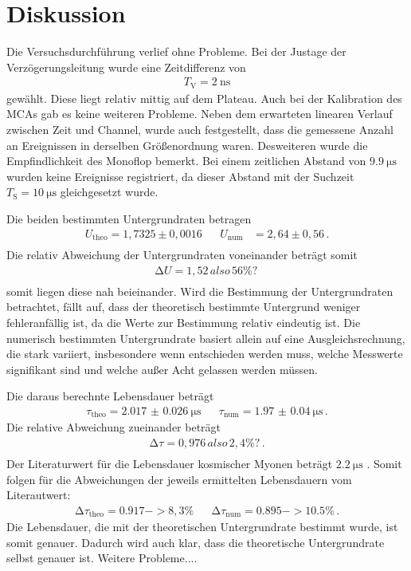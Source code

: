 \section{Diskussion}
\label{sec:Diskussion}
Die Versuchsdurchführung verlief ohne Probleme.
Bei der Justage der Verzögerungsleitung wurde eine Zeitdifferenz von
\begin{align*}
    T_\text{V} = \SI{2}{\nano\second}
\end{align*}
gewählt.
Diese liegt relativ mittig auf dem Plateau.
Auch bei der Kalibration des MCAs gab es keine weiteren Probleme.
Neben dem erwarteten linearen Verlauf zwischen Zeit und Channel, wurde auch festgestellt, dass die gemessene Anzahl an Ereignissen in derselben Größenordnung waren.
Desweiteren wurde die Empfindlichkeit des Monoflop bemerkt.
Bei einem zeitlichen Abstand von $\SI{9.9}{\micro\second}$ wurden keine Ereignisse registriert, da dieser Abstand mit der Suchzeit $T_\text{S} = \SI{10}{\micro\second}$ gleichgesetzt wurde.

\noindent
Die beiden bestimmten Untergrundraten betragen
\begin{align*}
    U_\text{theo} = 1,7325 \pm 0,0016 &&       U_\text{num} &= 2,64 \pm 0,56 \, . \\
\end{align*}
Die relativ Abweichung der Untergrundraten voneinander beträgt somit
\begin{align*}
    \increment U = 1,52 \, also \, 56\% ? \, \\
\end{align*} %
somit liegen diese nah beieinander.
Wird die Bestimmung der Untergrundraten betrachtet, fällt auf, dass der theoretisch bestimmte Untergrund weniger fehleranfällig ist, da die Werte zur Bestimmung relativ eindeutig ist.
Die numerisch bestimmten Untergrundrate basiert allein auf eine Ausgleichsrechnung, die stark variiert, insbesondere wenn entschieden werden muss, welche Messwerte signifikant sind und welche außer Acht gelassen werden müssen.

\noindent
Die daraus berechnte Lebensdauer beträgt
\begin{align*}
    \tau_\text{theo} = \SI{2.017(26)}{\micro\second} && \tau_\text{num} = \SI{1.97(4)}{\micro\second} \, .
\end{align*}
Die relative Abweichung zueinander beträgt
\begin{align*}
    \increment \tau = 0,976 \, also \, 2,4\% ? \, . \\
\end{align*}%
Der Literaturwert für die Lebensdauer kosmischer Myonen beträgt $\SI{2.2}{\micro\second}$ \cite{pdg}.
Somit folgen für die Abweichungen der jeweils ermittelten Lebensdauern vom Literautwert:
\begin{align*}
    \increment \tau_\text{theo} = 0.917 -> 8,3\% && \increment \tau_\text{num} = 0.895 -> 10.5\% \, .
\end{align*}
Die Lebensdauer, die mit der theoretischen Untergrundrate bestimmt wurde, ist somit genauer.
Dadurch wird auch klar, dass die theoretische Untergrundrate selbst genauer ist.
Weitere Probleme....
